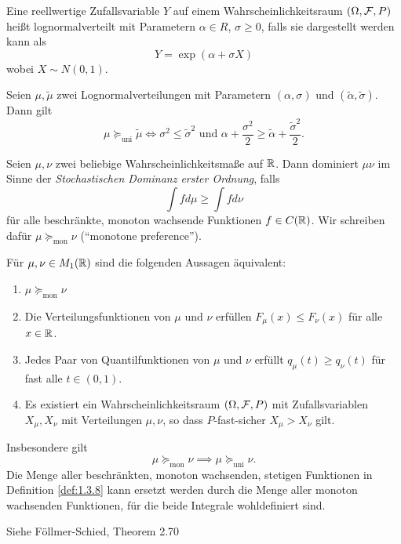 \documentclass[a4paper,twoside,DIV15,BCOR12mm]{scrbook}
\newcommand{\unisucceq}{\succeq_{\text{uni}}}
\newcommand{\monsucceq}{\succeq_{\text{mon}}}
\begin{document}
\begin{definition}
Eine reellwertige Zufallsvariable $Y$ auf einem Wahrscheinlichkeitsraum $(\Omega, \mathcal{F}, P)$ heißt lognormalverteilt mit Parametern $\alpha\in R$, $\sigma \ge 0$, falls sie dargestellt werden kann als 
\[
Y = \exp(\alpha  + \sigma X)
\]
wobei $X \sim N(0, 1)$.
\end{definition}

\begin{satz}
Seien $\mu, \tilde\mu$ zwei Lognormalverteilungen mit Parametern $(\alpha,\sigma)$ und $(\tilde\alpha,\tilde\sigma)$. Dann gilt 
\[
\mu \unisucceq \tilde\mu \iff \sigma^2 \le \tilde\sigma^2 \text{ und } \alpha + \frac{\sigma^2}2 \ge \tilde\alpha + \frac{\tilde\sigma^2}2.
\]
\end{satz}

\begin{definition}
\label{def:1.3.8}Seien $\mu,\nu$ zwei beliebige Wahrscheinlichkeitsmaße auf $\mathbb{R}$. Dann dominiert $\mu \nu$ im Sinne der \emph{Stochastischen Dominanz erster Ordnung}, falls 
\[
\int f d\mu \ge \int fd\nu
\]
für alle beschränkte, monoton wachsende Funktionen $f\in C(\mathbb{R})$. Wir schreiben dafür $\mu\monsucceq \nu$ (“monotone preference”).
\end{definition}

\begin{satz}
\label{satz:1.3.9}Für $\mu,\nu \in M_1(\mathbb{R})$ sind die folgenden Aussagen äquivalent:
\begin{enumerate}
\item $\mu\monsucceq\nu$
\item Die Verteilungsfunktionen von $\mu$ und $\nu$ erfüllen $F_\mu(x) \le F_\nu(x)$ für alle $x\in\mathbb{R}$.
\item Jedes Paar von Quantilfunktionen von $\mu$ und $\nu$ erfüllt $q_\mu(t) \ge q_\nu(t)$ für fast alle $t\in(0, 1)$.
\item Es existiert ein Wahrscheinlichkeitsraum $(\Omega,\mathcal{F}, P)$ mit Zufallsvariablen $X_\mu, X_\nu$ mit Verteilungen $\mu, \nu$, so dass $P$-fast-sicher $X_\mu > X_\nu$ gilt.
\end{enumerate}
Insbesondere gilt \[
\mu\monsucceq\nu \implies \mu\unisucceq\nu.
\]
Die Menge aller beschränkten, monoton wachsenden, stetigen Funktionen in Definition \ref{def:1.3.8} kann ersetzt werden durch die Menge aller monoton wachsenden Funktionen, für die beide Integrale wohldefiniert sind.
\end{satz}

\begin{beweis}
Siehe Föllmer-Schied, Theorem 2.70
\end{beweis}
\end{document}
